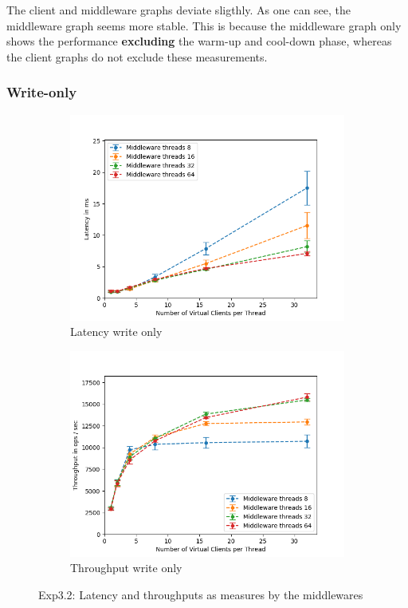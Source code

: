 \documentclass[11pt,a4paper]{article}
\begin{document}
The client and middleware graphs deviate sligthly.
As one can see, the middleware graph seems more stable.
This is because the middleware graph only shows the performance \textbf{excluding} the warm-up and cool-down phase, whereas the client graphs do not exclude these measurements.


\subsubsection{Write-only}

\begin{figure}[H]
\centering
\begin{subfigure}{.5\textwidth}
    \centering
    \includegraphics[width=\textwidth]{img/exp3_2/exp3_2__latency_middleware_write_1.png}
    \caption{Latency write only}
    \label{fig:mesh1}
\end{subfigure}%
\begin{subfigure}{.5\textwidth}
      \centering
    \includegraphics[width=\textwidth]{img/exp3_2/exp3_2__throughput_middleware_write_1.png}
    \caption{Throughput write only}
    \label{fig:mesh1}
\end{subfigure}
\caption{Exp3.2: Latency and throughputs as measures by the middlewares}
\label{fig:test}
\end{figure}
\end{document}
